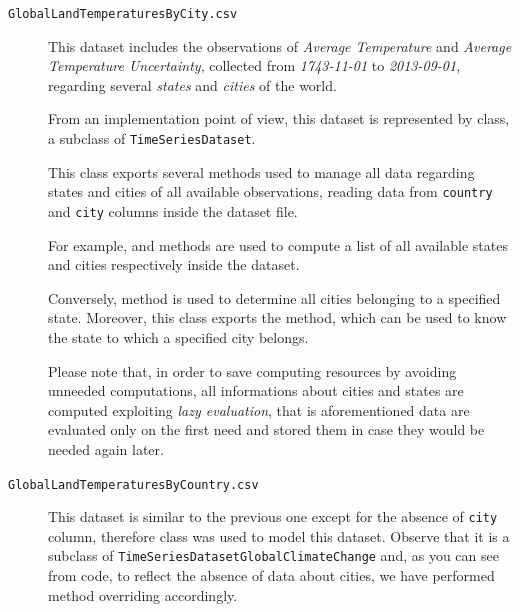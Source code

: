 \documentclass[sigconf]{acmart}
\begin{document}
\begin{description}
\item[\texttt{GlobalLandTemperaturesByCity.csv}] This dataset includes the observations of \textit{Average Temperature} and \textit{Average Temperature Uncertainty}, collected from \textit{1743-11-01} to \textit{2013-09-01}, regarding several \textit{states} and \textit{cities} of the world.

From an implementation point of view, this dataset is represented by  class, a subclass of \texttt{TimeSeriesDataset}. 

This class exports several methods used to manage all data regarding states and cities of all available observations, reading data from \texttt{country} and \texttt{city} columns inside the dataset file.

For example,  and
 methods are used to compute a list of all available states and cities respectively inside the dataset.
 
Conversely,  method is used to determine all cities belonging to a specified state. Moreover, this class exports the  method, which can be used to know the state to which a specified city belongs.

Please note that, in order to save computing resources by avoiding unneeded computations, all informations about cities and states are computed exploiting \textit{lazy evaluation}, that is aforementioned data are evaluated only on the first need and stored them in case they would be needed again later.

\item[\texttt{GlobalLandTemperaturesByCountry.csv}] This dataset is similar to the previous one except for the absence of \texttt{city} column, therefore  class was used to model this dataset. Observe that it is a subclass of \texttt{TimeSeriesDatasetGlobalClimateChange} and, as you can see from code, to reflect the absence of data about cities, we have performed method overriding accordingly.


\end{description}
\end{document}
